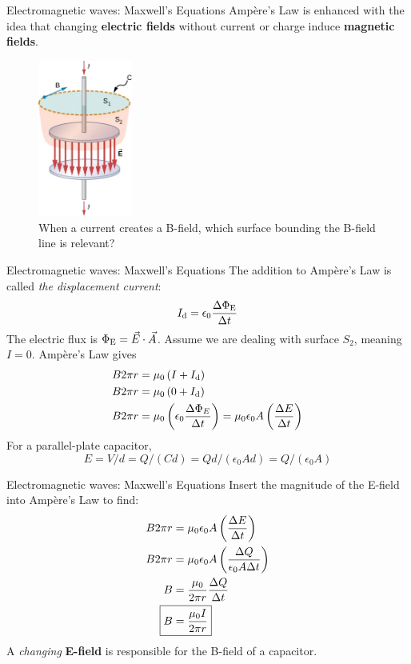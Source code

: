 \documentclass{beamer}
\begin{document}
\begin{frame}{Electromagnetic waves: Maxwell's Equations}
Amp\`{e}re's Law is enhanced with the idea that changing \textbf{electric fields} without current or charge induce \textbf{magnetic fields}.
\begin{figure}
\centering
\includegraphics[width=0.275\textwidth]{figures/displacement_current.png}
\caption{\label{fig:disp_current} When a current creates a B-field, which surface bounding the B-field line is relevant?}
\end{figure}
\end{frame}

\begin{frame}{Electromagnetic waves: Maxwell's Equations}
\small
The addition to Amp\`{e}re's Law is called \textit{the displacement current}:
\begin{equation}
I_{\rm d} = \epsilon_0 \frac{\Delta \Phi_{\rm E}}{\Delta t}
\end{equation}
The electric flux is $\Phi_{\rm E} = \vec{E} \cdot \vec{A}$.  Assume we are dealing with surface $S_2$, meaning $I = 0$.  Amp\`{e}re's Law gives
\begin{align}
B 2\pi r &= \mu_0\left(I + I_{\rm d}\right) \\
B 2\pi r &= \mu_0\left(0 + I_{\rm d}\right) \\
B 2\pi r &= \mu_0\left(\epsilon_0 \frac{\Delta \Phi_E}{\Delta t} \right) = \mu_0\epsilon_0 A\left(\frac{\Delta E}{\Delta t}\right)
\end{align}
For a parallel-plate capacitor,
\begin{equation}
E = V/d = Q/(Cd) = Qd/(\epsilon_0 A d) = Q/(\epsilon_0 A)
\end{equation}
\end{frame}

\begin{frame}{Electromagnetic waves: Maxwell's Equations}
Insert the magnitude of the E-field into Amp\`{e}re's Law to find:
\begin{align}
B 2\pi r &= \mu_0\epsilon_0 A\left(\frac{\Delta E}{\Delta t}\right) \\
B 2\pi r &= \mu_0\epsilon_0 A \left(\frac{\Delta Q}{\epsilon_0 A \Delta t}\right) \\
B &= \frac{\mu_0}{2\pi r} \frac{\Delta Q}{\Delta t} \\
\Aboxed{ B &= \frac{\mu_0 I}{2\pi r} }
\end{align}
A \textit{changing} \textbf{\alert{E-field}} is responsible for the B-field of a capacitor.
\end{frame}
\end{document}
